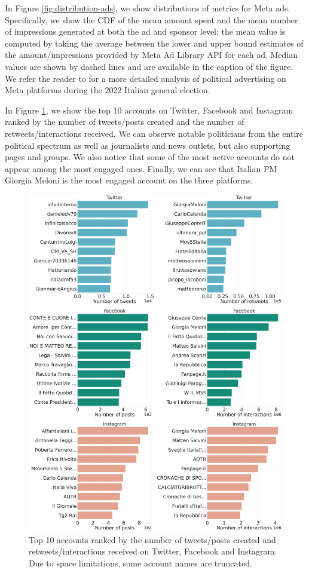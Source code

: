 \documentclass[letterpaper]{article} %
\begin{document}
In Figure \ref{fig:distribution-ads}, we show distributions of metrics for Meta ads. Specifically, we show the CDF of the mean amount spent and the mean number of impressions generated at both the ad and sponsor level; the mean value is computed by taking the average between the lower and upper bound estimates of the amount/impressions provided by Meta Ad Library API for each ad. Median values are shown by dashed lines and are available in the caption of the figure. We refer the reader to \cite{pierri2022political} for a more detailed analysis of political advertising on Meta platforms during the 2022 Italian general election.

In Figure \ref{fig:top-ten}, we show the top 10 accounts on Twitter, Facebook and Instagram ranked by the number of tweets/posts created and the number of retweets/interactions received. We can observe notable politicians from the entire political spectrum as well as journalists and news outlets, but also supporting pages and groups. We also notice that some of the most active accounts do not appear among the most engaged ones. Finally, we can see that Italian PM Giorgia Meloni is the most engaged account on the three platforms.

\begin{figure}[!t]
    \centering
    \includegraphics[width=\linewidth]{top_ten.png}
    \caption{Top 10 accounts ranked by the number of tweets/posts created and retweets/interactions received on Twitter, Facebook and Instagram. Due to space limitations, some account names are truncated.}
    \label{fig:top-ten}
\end{figure}
\end{document}
